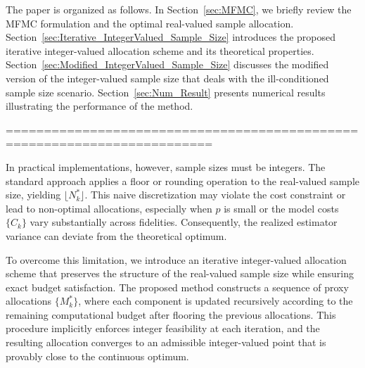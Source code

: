 The paper is organized as follows. In Section~\ref{sec:MFMC}, we briefly review the MFMC formulation and the optimal real-valued sample allocation. Section~\ref{sec:Iterative_IntegerValued_Sample_Size} introduces the proposed iterative integer-valued allocation scheme and its theoretical properties. 
Section~\ref{sec:Modified_IntegerValued_Sample_Size} discusses the modified version of the integer-valued sample size that deals with the ill-conditioned sample size scenario.
Section~\ref{sec:Num_Result} presents numerical results illustrating the performance of the method. 




=========================================================================






In practical implementations, however, sample sizes must be integers. The standard approach applies a floor or rounding operation to the real-valued sample size, yielding $\lfloor N_k^* \rfloor$. This naive discretization may violate the cost constraint or lead to non-optimal allocations, especially when $p$ is small or the model costs $\{C_k\}$ vary substantially across fidelities. Consequently, the realized estimator variance can deviate from the theoretical optimum.

To overcome this limitation, we introduce an iterative integer-valued allocation scheme that preserves the structure of the real-valued sample size while ensuring exact budget satisfaction. The proposed method constructs a sequence of proxy allocations $\{M_k^*\}$, where each component is updated recursively according to the remaining computational budget after flooring the previous allocations. This procedure implicitly enforces integer feasibility at each iteration, and the resulting allocation converges to an admissible integer-valued point that is provably close to the continuous optimum.







